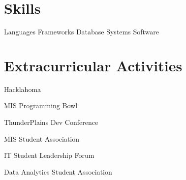 \documentclass[letterpaper]{resumeconfig}
\begin{document}

\section{Skills}

\begin{Skills}
	\SkillCategory
	{Languages}
	{
		     
	}
	\SkillCategory
	{Frameworks}
	{
		      
	}
	\SkillCategory
	{Database Systems}
	{
		   
	}
	\SkillCategory
	{Software}
	{
		       
	}	
\end{Skills}
\vspace{-0.5em}


\section{Extracurricular Activities}

    \begin{ActivitiesList}
        \item Hacklahoma
        \item MIS Programming Bowl
        \item ThunderPlains Dev Conference
        \item MIS Student Association
        \item IT Student Leadership Forum
        \item Data Analytics Student Association
    \end{ActivitiesList}
\end{document}
